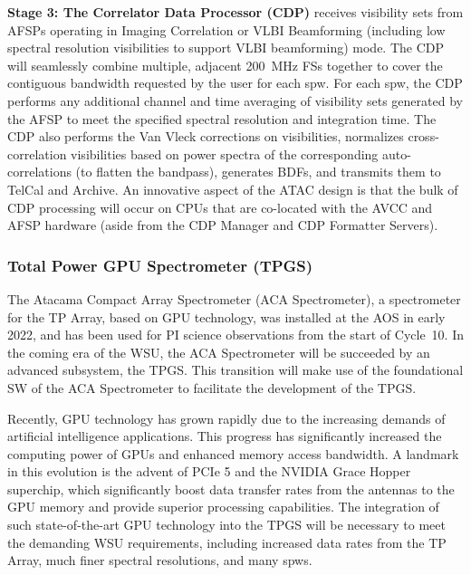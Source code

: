 \textbf{Stage 3: The Correlator Data Processor (CDP)} receives visibility sets from AFSPs operating in Imaging Correlation or VLBI Beamforming (including low spectral resolution visibilities to support VLBI beamforming) mode.  The CDP will seamlessly combine multiple, adjacent 200~MHz FSs together to cover the contiguous bandwidth requested by the user for each spw. For each spw, the CDP performs any additional channel and time averaging of visibility sets generated by the AFSP to meet the specified spectral resolution and integration time.  The CDP also performs the Van Vleck corrections on visibilities, normalizes cross-correlation visibilities based on power spectra of the corresponding auto-correlations (to flatten the bandpass), generates BDFs, and transmits them to TelCal and Archive. An innovative aspect of the ATAC design is that the bulk of CDP processing will occur on CPUs that are co-located with the AVCC and AFSP hardware (aside from the CDP Manager and CDP Formatter Servers).


\subsubsection{Total Power GPU Spectrometer (TPGS)}
\label{sec:TPGS}
The Atacama Compact Array Spectrometer (ACA Spectrometer), a spectrometer for the TP Array, based on GPU technology, was installed at the AOS in early 2022, and has been used for PI science observations from the start of Cycle~10. In the coming era of the WSU, the ACA Spectrometer will be succeeded by an advanced subsystem, the TPGS. This transition will make use of the foundational SW of the ACA Spectrometer to facilitate the development of the TPGS.

Recently, GPU technology has grown rapidly due to the increasing demands of artificial intelligence applications. This progress has significantly increased the computing power of GPUs and enhanced memory access bandwidth. A landmark in this evolution is the advent of PCIe 5 and the NVIDIA Grace Hopper superchip, which significantly boost data transfer rates from the antennas to the GPU memory and provide superior processing capabilities. The integration of such state-of-the-art GPU technology into the TPGS will be necessary to meet the demanding WSU requirements, including increased data rates from the TP Array, much finer spectral resolutions, and many spws.

